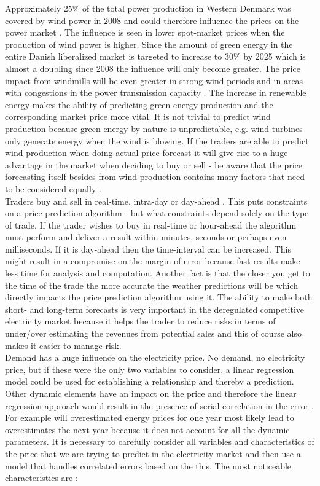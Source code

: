 \documentclass[twoside,11pt,openright]{report}
\begin{document}
Approximately 25\% of the total power production in Western Denmark was covered by wind power in 2008 and could therefore influence the prices on the power market \cite{windPowerDanishLiberalized}. The influence is seen in lower spot-market prices when the production of wind power is higher. Since the amount of green energy in the entire Danish liberalized market is targeted to increase to 30\% by 2025 which is almost a doubling since 2008 \cite{windPowerDanishLiberalized} the influence will only become greater. The price impact from windmills will be even greater in strong wind periods and in areas with congestions in the power transmission capacity \cite{windPowerDanishLiberalized}. The increase in renewable energy makes the ability of predicting green energy production and the corresponding market price more vital. It is not trivial to predict wind production because green energy by nature is unpredictable, e.g. wind turbines only generate energy when the wind is blowing. If the traders are able to predict wind production when doing actual price forecast it will give rise to a huge advantage in the market when deciding to buy or sell - be aware that the price forecasting itself besides from wind production contains many factors that need to be considered equally \cite{21}. 
\\[0.5cm] Traders buy and sell in real-time, intra-day or day-ahead
\cite{FIND REF}. This puts constraints on a price prediction algorithm - but what constraints depend solely on the type of trade. If the trader wishes to buy in real-time or hour-ahead the algorithm must perform and deliver a result within minutes, seconds or perhaps even milliseconds. If it is day-ahead then the time-interval can be increased. This might result in a compromise on the margin of error because fast results make less time for analysis and computation. Another fact is that the closer you get to the time of the trade the more accurate the weather predictions will be which directly impacts the price prediction algorithm using it. The ability to make both short- and long-term forecasts is very important in the deregulated competitive electricity market because it helps the trader to reduce risks in terms of under/over estimating the revenues from potential sales and this of course also makes it easier to manage risk\cite{21}.
\\[0.5cm]
Demand has a huge influence on the electricity price. No demand, no electricity price, but if these were the only two variables to consider, a linear regression model could be used for establishing a relationship and thereby a prediction. Other dynamic elements have an impact on the price and therefore the linear regression approach would result in the presence of serial correlation in the error \cite{21}. For example will overestimated energy prices for one year most likely lead to overestimates the next year because it does not account for all the dynamic parameters. It is necessary to carefully consider all variables and characteristics of the price that we are trying to predict in the electricity market and then use a model that handles correlated errors based on the this. The most noticeable characteristics are \cite{21}:
\end{document}
